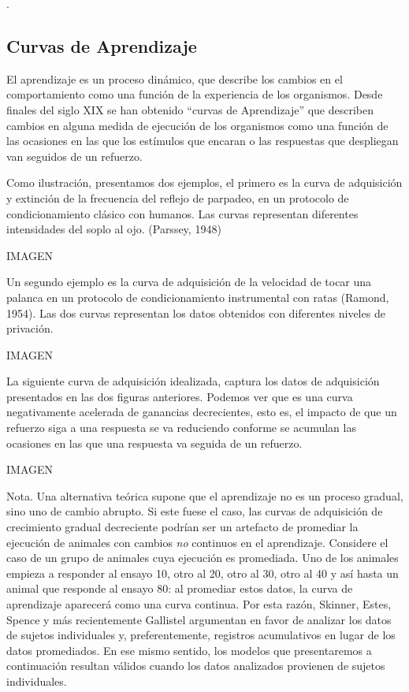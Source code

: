 \documentclass[
  letterpaper,
]{book}
\begin{document}
.

\subsection{Curvas de Aprendizaje}\label{curvas-de-aprendizaje}

El aprendizaje es un proceso dinámico, que describe los cambios en el
comportamiento como una función de la experiencia de los organismos.
Desde finales del siglo XIX se han obtenido ``curvas de Aprendizaje''
que describen cambios en alguna medida de ejecución de los organismos
como una función de las ocasiones en las que los estímulos que encaran o
las respuestas que despliegan van seguidos de un refuerzo.

Como ilustración, presentamos dos ejemplos, el primero es la curva de
adquisición y extinción de la frecuencia del reflejo de parpadeo, en un
protocolo de condicionamiento clásico con humanos. Las curvas
representan diferentes intensidades del soplo al ojo. (Parssey, 1948)

IMAGEN

Un segundo ejemplo es la curva de adquisición de la velocidad de tocar
una palanca en un protocolo de condicionamiento instrumental con ratas
(Ramond, 1954). Las dos curvas representan los datos obtenidos con
diferentes niveles de privación.

IMAGEN

La siguiente curva de adquisición idealizada, captura los datos de
adquisición presentados en las dos figuras anteriores. Podemos ver que
es una curva negativamente acelerada de ganancias decrecientes, esto es,
el impacto de que un refuerzo siga a una respuesta se va reduciendo
conforme se acumulan las ocasiones en las que una respuesta va seguida
de un refuerzo.

IMAGEN

Nota. Una alternativa teórica supone que el aprendizaje no es un proceso
gradual, sino uno de cambio abrupto. Si este fuese el caso, las curvas
de adquisición de crecimiento gradual decreciente podrían ser un
artefacto de promediar la ejecución de animales con cambios \emph{no}
continuos en el aprendizaje. Considere el caso de un grupo de animales
cuya ejecución es promediada. Uno de los animales empieza a responder al
ensayo 10, otro al 20, otro al 30, otro al 40 y así hasta un animal que
responde al ensayo 80: al promediar estos datos, la curva de aprendizaje
aparecerá como una curva continua. Por esta razón, Skinner, Estes,
Spence y más recientemente Gallistel argumentan en favor de analizar los
datos de sujetos individuales y, preferentemente, registros acumulativos
en lugar de los datos promediados. En ese mismo sentido, los modelos que
presentaremos a continuación resultan válidos cuando los datos
analizados provienen de sujetos individuales.
\end{document}
